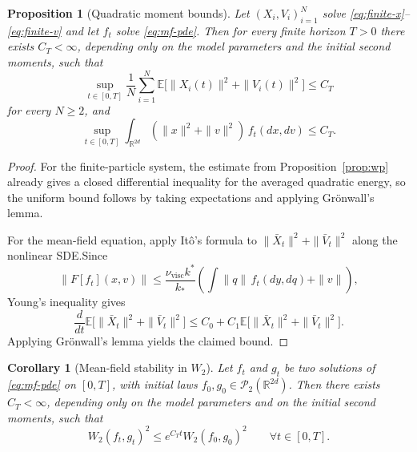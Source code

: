 \documentclass[11pt]{article}
\newtheorem{proposition}[theorem]{Proposition}
\newtheorem{corollary}[theorem]{Corollary}
\theoremstyle{definition}
\theoremstyle{remark}
\newcommand{\R}{\mathbb{R}}
\newcommand{\E}{\mathbb{E}}
\newcommand{\mcP}{\mathcal{P}}
\begin{document}
\begin{proposition}[Quadratic moment bounds]\label{prop:moments}
Let $(X_i,V_i)_{i=1}^N$ solve \eqref{eq:finite-x}--\eqref{eq:finite-v} and let
$f_t$ solve \eqref{eq:mf-pde}. Then for every finite horizon $T>0$ there exists
$C_T<\infty$, depending only on the model parameters and the initial second
moments, such that
\[
\sup_{t\in[0,T]}
\frac1N\sum_{i=1}^N \E\bigl[\|X_i(t)\|^2+\|V_i(t)\|^2\bigr]
\leq C_T
\]
for every $N\geq2$, and
\[
\sup_{t\in[0,T]}
\int_{\R^{2d}} (\|x\|^2+\|v\|^2)\,f_t(dx,dv)
\leq C_T.
\]
\end{proposition}

\begin{proof}
For the finite-particle system, the estimate from Proposition~\ref{prop:wp}
already gives a closed differential inequality for the averaged quadratic
energy, so the uniform bound follows by taking expectations and applying
Gr\"onwall's lemma.

For the mean-field equation, apply It\^o's formula to
\(\|\bar X_t\|^2+\|\bar V_t\|^2\) along the nonlinear SDE.\@ Since
\[
\|F[f_t](x,v)\|
\leq
\frac{\nu_{\mathrm{visc}}k^*}{k_*}
\left(\int \|q\|\,f_t(dy,dq)+\|v\|\right),
\]
Young's inequality gives
\[
\frac{d}{dt}\E\bigl[\|\bar X_t\|^2+\|\bar V_t\|^2\bigr]
\leq
C_0+C_1\E\bigl[\|\bar X_t\|^2+\|\bar V_t\|^2\bigr].
\]
Applying Gr\"onwall's lemma yields the claimed bound.
\end{proof}

\begin{corollary}[Mean-field stability in \(W_2\)]\label{cor:mf-stability}
Let \(f_t\) and \(g_t\) be two solutions of \eqref{eq:mf-pde} on \([0,T]\),
with initial laws \(f_0,g_0\in\mcP_2(\R^{2d})\). Then there exists
\(C_T<\infty\), depending only on the model parameters and on the initial
second moments, such that
\[
W_2(f_t,g_t)^2
\le
e^{C_T t}W_2(f_0,g_0)^2
\qquad
\forall t\in[0,T].
\]
\end{corollary}
\end{document}
